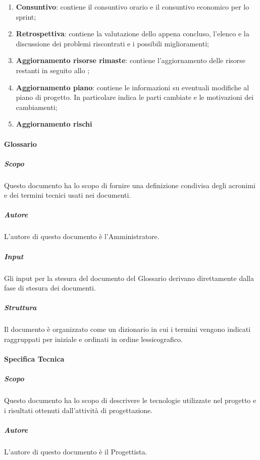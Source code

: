 \begin{enumerate}
\begin{enumerate}
        \item \textbf{Consuntivo}: contiene il consuntivo orario e il consuntivo economico per lo sprint;
        
        \item \textbf{Retrospettiva}: contiene la valutazione dello  appena concluso, l'elenco e la discussione dei problemi riscontrati e i possibili miglioramenti;

        \item \textbf{Aggiornamento risorse rimaste}: contiene l'aggiornamento delle risorse restanti in seguito allo ;


        \item \textbf{Aggiornamento piano}: contiene le informazioni su eventuali modifiche al piano di progetto.
        In particolare indica le parti cambiate e le motivazioni dei cambiamenti; 

        \item \textbf{Aggiornamento rischi}
    \end{enumerate}

\end{enumerate}

\paragraph{Glossario}

\subparagraph{Scopo}
Questo documento ha lo scopo di fornire una definizione condivisa degli acronimi e dei termini tecnici usati nei documenti.

\subparagraph{Autore} 
L'autore di questo documento è l'Amministratore.

\subparagraph{Input}
Gli input per la stesura del documento del Glossario derivano direttamente dalla fase di stesura dei documenti.

\subparagraph{Struttura}
Il documento è organizzato come un dizionario in cui i termini vengono indicati raggruppati per iniziale e ordinati in ordine lessicografico.


\paragraph{Specifica Tecnica}

\subparagraph{Scopo}
Questo documento ha lo scopo di descrivere le tecnologie utilizzate nel progetto e i risultati ottenuti dall'attività di progettazione.

\subparagraph{Autore} 
L'autore di questo documento è il Progettista.

